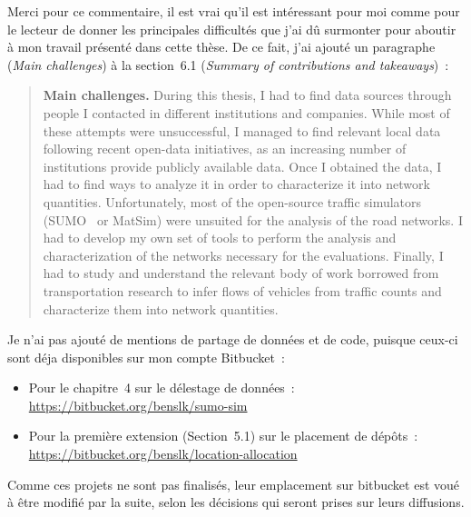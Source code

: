 \documentclass[11pt]{article}
\begin{document}
Merci pour ce commentaire, il est vrai qu'il est intéressant pour moi comme pour le lecteur de donner les principales difficultés que j'ai dû surmonter pour aboutir à mon travail présenté dans cette thèse. De ce fait, j'ai ajouté un paragraphe (\textit{Main challenges}) à la section~6.1 (\textit{Summary of contributions and takeaways})~:
\begin{quote}
\noindent\textbf{Main challenges.}
During this thesis, I had to find data sources through people I contacted in different institutions and companies. While most of these attempts were unsuccessful, I managed to find relevant local data following recent open-data initiatives, as an increasing number of institutions provide publicly available data. Once I obtained the data, I had to find ways to analyze it in order to characterize it into network quantities. Unfortunately, most of the open-source traffic simulators (SUMO~\cite{behrisch2011sumo} or MatSim) were unsuited for the analysis of the road networks. I had to develop my own set of tools to perform the analysis and characterization of the networks necessary for the evaluations. Finally, I had to study and understand the relevant body of work borrowed from transportation research to infer flows of vehicles from traffic counts and characterize them into network quantities.
\end{quote}

Je n'ai pas ajouté de mentions de partage de données et de code, puisque ceux-ci sont déja disponibles sur mon compte Bitbucket~:
\begin{itemize}
    \item Pour le chapitre~4 sur le délestage de données~:\\ \url{https://bitbucket.org/benslk/sumo-sim}
    \item Pour la première extension (Section~5.1) sur le placement de dépôts~:\\ \url{https://bitbucket.org/benslk/location-allocation}
\end{itemize}
Comme ces projets ne sont pas finalisés, leur emplacement sur bitbucket est voué à être modifié par la suite, selon les décisions qui seront prises sur leurs diffusions.



\end{document}
